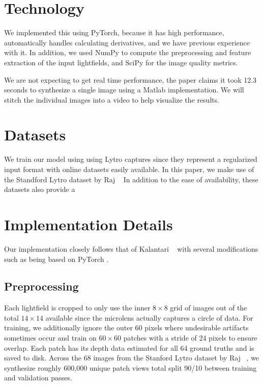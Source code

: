 \documentclass[10pt,twocolumn,letterpaper]{article}
\begin{document}
\section{Technology}

We implemented this using PyTorch, because it has high performance, 
automatically handles calculating derivatives, and we have previous experience with it.
In addition, we used NumPy to compute the preprocessing and feature extraction of the input lightfields,
and SciPy for the image quality metrics.

We are not expecting to get real time performance, the paper claims it took 12.3 seconds to synthesize
a single image using a Matlab implementation. We will stitch the individual images into a video to
help visualize the results.

\section{Datasets}

We train our model using using Lytro captures since they represent a regularized input format with
online datasets easily available. In this paper, we make use of the Standford Lytro dataset by Raj \etal~\cite{StanfordLytro}
In addition to the ease of availability, these datasets also provide a 

\section{Implementation Details}

Our implementation closely follows that of Kalantari \etal~\cite{LearningViewSynthesis} with several modifications such
as being based on PyTorch \cite{PyTorch}.

\subsection{Preprocessing}

Each lightfield is cropped to only use the inner $8 \times 8$ grid of images out of the total $14 \times 14$ available
since the microlens actually captures a circle of data. For training, we additionally ignore the outer 60 pixels where
undesirable artifacts sometimes occur and train on $60\times60$ patches with a stride of 24 pixels to ensure overlap.
Each patch has its depth data estimated for all 64 ground truths and is saved to disk. Across the 68 images from the
Stanford Lytro dataset by Raj \etal~\cite{StanfordLytro}, we synthesize roughly 600,000 unique patch views total split
90/10 between training and validation passes.
\end{document}
